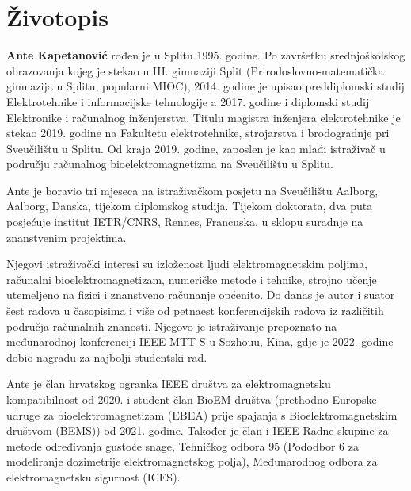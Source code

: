 \section*{Životopis}
\vspace{15mm}
\noindent
\textbf{Ante Kapetanović} rođen je u Splitu 1995. godine.
Po završetku srednjoškolskog obrazovanja kojeg je stekao u III. gimnaziji Split (Prirodoslovno-matematička gimnazija u Splitu, popularni MIOC), 2014. godine je upisao preddiplomski studij Elektrotehnike i informacijske tehnologije a 2017. godine i diplomski studij Elektronike i računalnog inženjerstva.
Titulu magistra inženjera elektrotehnike je stekao 2019. godine na Fakultetu elektrotehnike, strojarstva i brodogradnje pri Sveučilištu u Splitu.
Od kraja 2019. godine, zaposlen je kao mlađi istraživač u području računalnog bioelektromagnetizma na Sveučilištu u Splitu.

Ante je boravio tri mjeseca na istraživačkom posjetu na Sveučilištu Aalborg, Aalborg, Danska, tijekom diplomskog studija.
Tijekom doktorata, dva puta posjećuje institut IETR/CNRS, Rennes, Francuska, u sklopu suradnje na znanstvenim projektima.

Njegovi istraživački interesi su izloženost ljudi elektromagnetskim poljima, računalni bioelektromagnetizam, numeričke metode i tehnike, strojno učenje utemeljeno na fizici i znanstveno računanje općenito.
Do danas je autor i suator šest radova u časopisima i više od petnaest konferencijskih radova iz različitih područja računalnih znanosti.
Njegovo je istraživanje prepoznato na međunarodnoj konferenciji IEEE MTT-S u Sozhouu, Kina, gdje je 2022. godine dobio nagradu za najbolji studentski rad.

Ante je član hrvatskog ogranka IEEE društva za elektromagnetsku kompatibilnost od 2020. i student-član BioEM društva (prethodno Europske udruge za bioelektromagnetizam (EBEA) prije spajanja s Bioelektromagnetskim društvom (BEMS)) od 2021. godine.
Također je član i IEEE Radne skupine za metode određivanja gustoće snage, Tehničkog odbora 95 (Pododbor 6 za modeliranje dozimetrije elektromagnetskog polja), Međunarodnog odbora za elektromagnetsku sigurnost (ICES).
\newpage